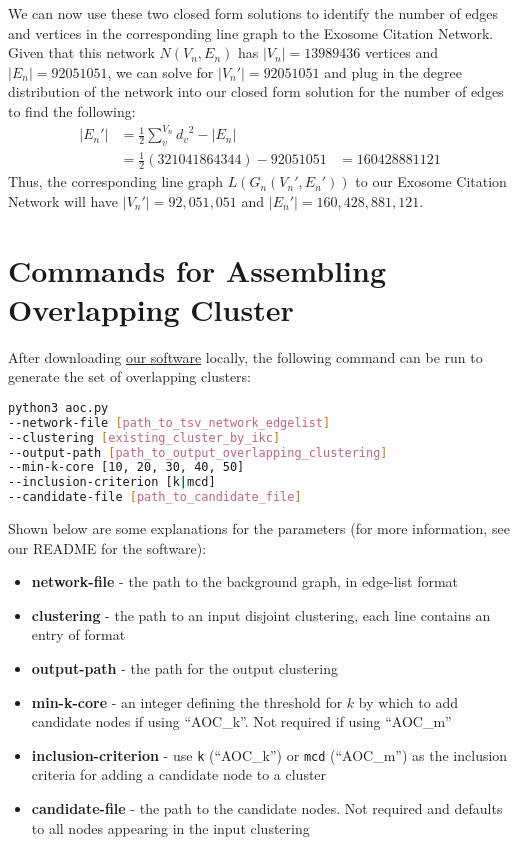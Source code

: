 \documentclass[12pt, oneside]{article}   	%
\begin{document}
We can now use these two closed form solutions to identify the number of edges and vertices in the corresponding line graph to the Exosome Citation Network. Given that this network $N(V_n, E_n)$ has $|V_n| = 13989436$ vertices and $|E_n| = 92051051$, we can solve for $|V_n'| = 92051051$ and plug in the degree distribution of the network into our closed form solution for the number of edges to find the following:
\begin{equation}
    \begin{aligned}
    |E_n'| &= \frac{1}{2}\sum^{V_n}_{v} {d_v}^2 - |E_n|\\
    &= \frac{1}{2}(321041864344) - 92051051
    &= 160428881121
    \end{aligned}
\end{equation}
Thus, the corresponding line graph $L(G_n(V_n', E_n'))$ to our Exosome Citation Network will have $|V_n'| = 92,051,051$ and $|E_n'| = 160,428,881,121$. 

\section{Commands for Assembling Overlapping Cluster} 

After downloading \href{https://github.com/illinois-or-research-analytics/aocv2_plus/tree/main/v2_revisions}{our software} locally, the following command can be run to generate the set of overlapping clusters:

\begin{lstlisting}[language=bash]
python3 aoc.py
--network-file [path_to_tsv_network_edgelist]
--clustering [existing_cluster_by_ikc]
--output-path [path_to_output_overlapping_clustering]
--min-k-core [10, 20, 30, 40, 50]
--inclusion-criterion [k|mcd]
--candidate-file [path_to_candidate_file]
\end{lstlisting}

Shown below are some explanations for the parameters (for more information, see our README for the software):

\begin{itemize}
\item \textbf{network-file} - the path to the background graph, in edge-list format
\item \textbf{clustering} - the path to an input disjoint clustering, each line contains an entry of format 
\item \textbf{output-path} - the path for the output clustering
\item \textbf{min-k-core} - an integer defining the threshold for $k$ by which to add candidate nodes if using ``AOC\_k''. Not required if using ``AOC\_m''
\item \textbf{inclusion-criterion} - use \texttt{k} (``AOC\_k'') or \texttt{mcd} (``AOC\_m'') as the inclusion criteria for adding a candidate node to a cluster
\item \textbf{candidate-file} - the path to the candidate nodes. Not required and defaults to all nodes appearing in the input clustering
\end{itemize}
\end{document}
